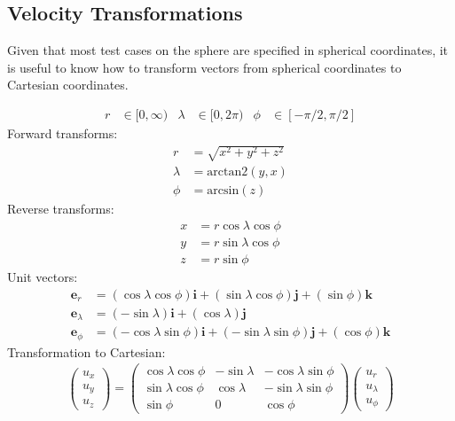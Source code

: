 \documentclass{report}
\newcommand{\vb}{\mathbf}
\begin{document}
\subsection{Velocity Transformations}

Given that most test cases on the sphere are specified in spherical coordinates, it is useful to know how to transform vectors from spherical coordinates to Cartesian coordinates.

\begin{align}
r &\in [0, \infty) & \lambda &\in [0,2\pi) & \phi &\in [-\pi/2,\pi/2]
\end{align}
Forward transforms:
\begin{align}
r &= \sqrt{x^2 + y^2 + z^2} \\
\lambda &= \mathrm{arctan2}(y,x) \\
\phi &= \mathrm{arcsin}(z)
\end{align}
Reverse transforms:
\begin{align}
x &= r \cos \lambda \cos \phi \\
y &= r \sin \lambda \cos \phi \\
z &= r \sin \phi
\end{align}
Unit vectors:
\begin{align}
\vb{e}_r &= (\cos \lambda \cos \phi) \vb{i} + (\sin \lambda \cos \phi) \vb{j} + (\sin \phi) \vb{k} \\
\vb{e}_\lambda &= (- \sin \lambda) \vb{i} + (\cos \lambda) \vb{j} \\
\vb{e}_\phi &= (-\cos \lambda \sin \phi) \vb{i} + (-\sin \lambda \sin \phi) \vb{j} + (\cos \phi) \vb{k}
\end{align}
Transformation to Cartesian:
\begin{align}
\left( \begin{array}{c} u_x \\ u_y \\ u_z \end{array} \right) = \left( \begin{array}{ccc} \cos \lambda \cos \phi & - \sin \lambda & - \cos \lambda \sin \phi \\ \sin \lambda \cos \phi & \cos \lambda & - \sin \lambda \sin \phi \\ \sin \phi & 0 & \cos \phi \end{array} \right) \left( \begin{array}{c} u_r \\ u_\lambda \\ u_\phi \end{array} \right)
\end{align}
\end{document}
